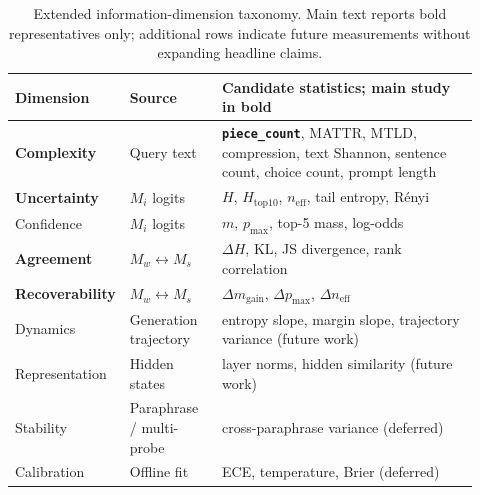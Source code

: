 \begin{table}[t]
  \centering
  \footnotesize
  \setlength{\tabcolsep}{3pt}
  \begin{tabular}{@{}p{0.14\linewidth}p{0.20\linewidth}p{0.58\linewidth}@{}}
    \toprule
    \textbf{Dimension} & \textbf{Source} & \textbf{Candidate statistics; main study in bold} \\
    \midrule
    \textbf{Complexity} & Query text &
    \textbf{\texttt{piece\_count}}, MATTR, MTLD, compression, text Shannon, sentence count, choice count, prompt length \\
    \addlinespace
    \textbf{Uncertainty} & $M_i$ logits &
    \textbf{$H$}, $H_{\mathrm{top10}}$, $n_{\mathrm{eff}}$, tail entropy, R\'enyi \\
    \addlinespace
    Confidence & $M_i$ logits &
    \textbf{$m$}, $p_{\max}$, top-5 mass, log-odds \\
    \addlinespace
    \textbf{Agreement} & $M_w{\leftrightarrow}M_s$ &
    \textbf{$\Delta H$}, KL, JS divergence, rank correlation \\
    \addlinespace
    \textbf{Recoverability} & $M_w{\leftrightarrow}M_s$ &
    \textbf{$\Delta m_{\mathrm{gain}}$}, $\Delta p_{\max}$, $\Delta n_{\mathrm{eff}}$ \\
    \addlinespace
    Dynamics & Generation trajectory &
    entropy slope, margin slope, trajectory variance (future work) \\
    \addlinespace
    Representation & Hidden states &
    layer norms, hidden similarity (future work) \\
    \addlinespace
    Stability & Paraphrase / multi-probe &
    cross-paraphrase variance (deferred) \\
    \addlinespace
    Calibration & Offline fit &
    ECE, temperature, Brier (deferred) \\
    \bottomrule
  \end{tabular}
  \caption{Extended information-dimension taxonomy. Main text reports bold representatives only; additional rows indicate future measurements without expanding headline claims.}
  \label{tab:dim-taxonomy}
\end{table}
